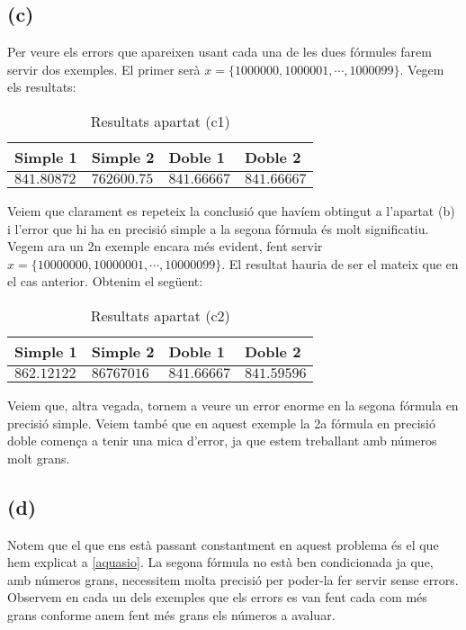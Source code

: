 \documentclass[a4paper,10pt]{article}
\begin{document}
  \subsection*{(c)}
  Per veure els errors que apareixen usant cada una de les dues fórmules farem servir dos exemples. El primer serà $x = \{ 1000000, 1000001, \dotsi , 1000099 \}$. Vegem els resultats:
	\begin{table}[H]
    \begin{center}
      \begin{tabular}[c]{|p{20mm}|p{20 mm}|p{20 mm}|p{20 mm}|}
			\hline 
			Simple 1 & Simple 2  & Doble 1  & Doble 2  \\ 
			\hline  
			$841.80872$
			&
			$762600.75$
			& 
			$841.66667$
			&
			$841.66667$ \\
			\hline
      \end{tabular}
		\caption{Resultats apartat (c1)}
    \end{center}
  \end{table}
  Veiem que clarament es repeteix la conclusió que havíem obtingut a l'apartat (b) i l'error que hi ha en precisió simple a la segona fórmula és molt significatiu. Vegem ara un 2n exemple encara més evident, fent servir $x = \{ 10000000, 10000001, \dotsi , 10000099 \}$. El resultat hauria de ser el mateix que en el cas anterior. Obtenim el següent:
	\begin{table}[H]
    \begin{center}
      \begin{tabular}[c]{|p{20mm}|p{20 mm}|p{20 mm}|p{20 mm}|}
			\hline 
			Simple 1 & Simple 2  & Doble 1  & Doble 2  \\ 
			\hline  
			$862.12122$
			&
			$86767016$
			& 
			$841.66667$
			&
			$841.59596$ \\
			\hline
      \end{tabular}
		\caption{Resultats apartat (c2)}
    \end{center}
  \end{table}
  Veiem que, altra vegada, tornem a veure un error enorme en la segona fórmula en precisió simple. Veiem també que en aquest exemple la 2a fórmula en precisió doble comença a tenir una mica d'error, ja que estem treballant amb números molt grans.
  \subsection*{(d)}
  Notem que el que ens està passant constantment en aquest problema és el que hem explicat a \ref{aquasio}. La segona fórmula no està ben condicionada ja que, amb números grans, necessitem molta precisió per poder-la fer servir sense errors. Observem en cada un dels exemples que els errors es van fent cada com més grans conforme anem fent més grans els números a avaluar.
\end{document}
